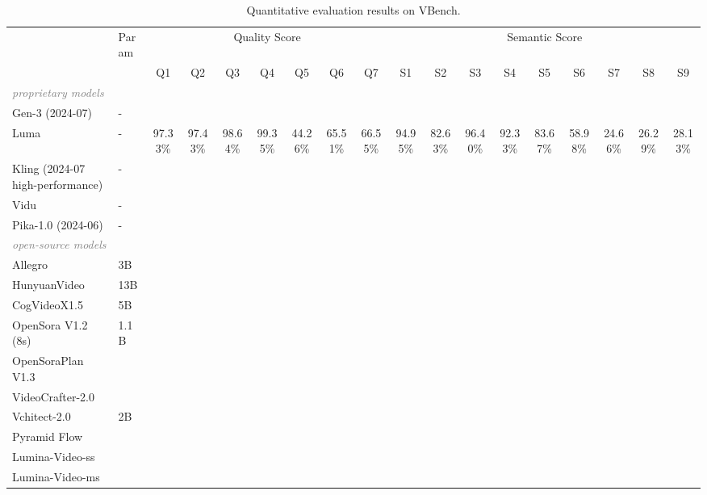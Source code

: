 \begin{table*}[t]
    \caption{Quantitative evaluation results on VBench.}
    \label{tab:vbench}
    \vskip 0.15in
    \begin{center}
        \begin{small}
            \begin{sc}
                \begin{tabular}{ll*{7}{c}*{9}{c}}
                    \toprule
                     &Param& \multicolumn{7}{c}{Quality Score} & \multicolumn{9}{c}{Semantic Score} \\
                    \cmidrule(lr){3-9} \cmidrule(lr){10-18}
                               && Q1 & Q2 & Q3 & Q4 & Q5 & Q6 & Q7 & S1 & S2 & S3 & S4 & S5 & S6 & S7 & S8 & S9 \\
                    \midrule
                    \textit{\textcolor{gray}{proprietary models}} &&&&&&&&&&&&&&&&& \\

                    Gen-3 (2024-07) & - &&&&&&&&&&&&&&&& \\
                    Luma & - &97.33\% &97.43\% &98.64\% &99.35\% &44.26\% &65.51\% &66.55\% &94.95\% &82.63\% &96.40\% &92.33\% &83.67\% &58.98\% &24.66\% &26.29\% &28.13\% \\
                    Kling (2024-07 high-performance) & - &&&&&&&&&&&&&&&& \\
                    Vidu & - &&&&&&&&&&&&&&&& \\
                    Pika-1.0 (2024-06) & - &&&&&&&&&&&&&&&& \\
                    
                    \midrule
                    \textit{\textcolor{gray}{open-source models}} &&&&&&&&&&&&&&&&& \\
                    Allegro & 3B &&&&&&&&&&&&&&&& \\ %
                    HunyuanVideo & 13B &&&&&&&&&&&&&&&& \\
                    CogVideoX1.5 & 5B &&&&&&&&&&&&&&&& \\
                    OpenSora V1.2 (8s) & 1.1B &&&&&&&&&&&&&&& \\
                    OpenSoraPlan V1.3 &&&&&&&&&&&&&&&& \\
                    VideoCrafter-2.0 &&&&&&&&&&&&&&&& \\
                    Vchitect-2.0 & 2B &&&&&&&&&&&&&&& \\
                    Pyramid Flow &&&&&&&&&&&&&&&&& \\
                    Lumina-Video-ss &&&&&&&&&&&&&&&&& \\
                    Lumina-Video-ms &&&&&&&&&&&&&&&&& \\
                    \bottomrule
                \end{tabular}
            \end{sc}
        \end{small}
    \end{center}
    \vskip -0.1in
\end{table*}